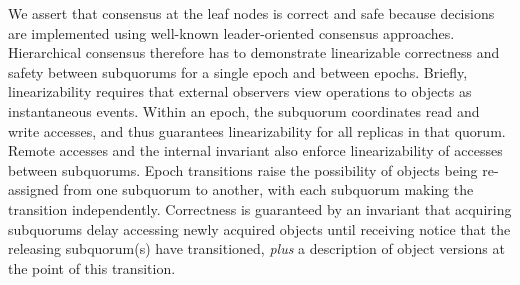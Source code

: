 \documentclass[11pt,letterpaper]{article}
\begin{document}
We assert that consensus at the leaf nodes is correct and safe because decisions are
implemented using well-known leader-oriented consensus approaches.
Hierarchical consensus therefore has to demonstrate linearizable correctness and safety
between subquorums for a single epoch and between epochs.
Briefly, linearizability requires that external observers view operations to objects as
instantaneous events.
Within an epoch, the subquorum coordinates read and write accesses, and thus guarantees
linearizability for all replicas in that quorum.
Remote accesses and the internal invariant also enforce linearizability of accesses
between subquorums.
Epoch transitions raise the possibility of objects being re-assigned from one subquorum to
another, with each subquorum making the transition independently. Correctness is
guaranteed by an invariant that acquiring subquorums delay accessing newly acquired objects
until receiving notice that the releasing subquorum(s) have transitioned, \emph{plus} a
description of object versions at the point of this transition.
\end{document}
